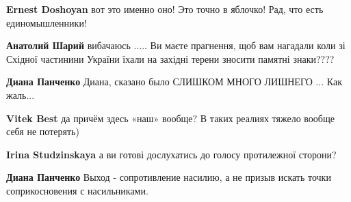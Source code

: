 \begin{itemize}
\begin{itemize}
 
\textbf{Ernest Doshoyan} вот это именно оно! Это точно в яблочко! Рад, что есть единомышленники!

 
\textbf{Анатолий Шарий} вибачаюсь .....
Ви маєте прагнення, щоб вам нагадали коли зі Східної частинини України їхали на західні терени зносити памятні знаки????

 
\textbf{Диана Панченко} Диана, сказано было СЛИШКОМ МНОГО ЛИШНЕГО ...
Как жаль...

 
\textbf{Vitek Best} да причём здесь «наш» вообще?
В таких реалиях тяжело вообще себя не потерять)

 
\textbf{Irina Studzinskaya} а ви готові дослухатись до голосу протилежної сторони?

 
\textbf{Диана Панченко} Выход - сопротивление насилию, а не призыв искать точки соприкосновения с насильниками.


\end{itemize}
\end{itemize}
